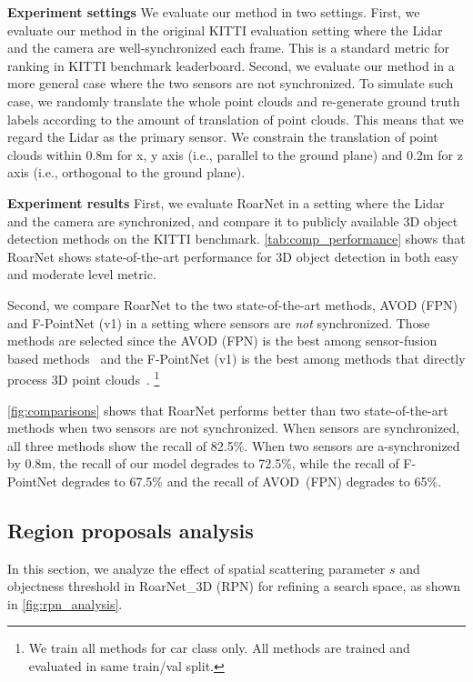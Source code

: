 \documentclass[letterpaper, 10 pt, conference]{ieeeconf}
\newcommand{\subsec}{\quad}
\begin{document}
\textbf{Experiment settings\subsec} We evaluate our method in two settings. First, we evaluate our method in the original KITTI evaluation setting where the Lidar and the camera are well-synchronized each frame. This is a standard metric for ranking in KITTI benchmark leaderboard. Second, we evaluate our method in a more general case where the two sensors are not synchronized.
To simulate such case, we randomly translate the whole point clouds and re-generate ground truth labels according to the amount of translation of point clouds. This means that we regard the Lidar as the primary sensor. We constrain the translation of point clouds within 0.8m for x, y axis (i.e., parallel to the ground plane) and 0.2m for z axis (i.e., orthogonal to the ground plane).

\textbf{Experiment results\subsec} First, we evaluate RoarNet in a setting where the Lidar and the camera are synchronized, and compare it to publicly available 3D object detection methods on the KITTI benchmark. \cref{tab:comp_performance} shows that RoarNet shows state-of-the-art performance for 3D object detection in both easy and moderate level metric.




Second, we compare RoarNet to the two state-of-the-art methods, AVOD (FPN) and F-PointNet (v1) in a setting where sensors are \textit{not} synchronized. Those methods are selected since the AVOD (FPN) is the best among sensor-fusion based methods~\cite{ku_joint_2017} and the F-PointNet (v1) is the best among methods that directly process 3D point clouds~\cite{qi_frustum_2018, zhou2017voxelnet}.
\footnote{We train all methods for car class only. All methods are trained and evaluated in same train/val split.}

\cref{fig:comparisons} shows that RoarNet performs better than two state-of-the-art methods when two sensors are not synchronized. When sensors are synchronized, all three methods show the recall of 82.5\%. When two sensors are a-synchronized by 0.8m, the recall of our model degrades to 72.5\%, while the recall of F-PointNet degrades to 67.5\% and the recall of AVOD~(FPN) degrades to 65\%.

\subsection{Region proposals analysis}
In this section, we analyze the effect of spatial scattering parameter $s$ and objectness threshold in RoarNet\_3D (RPN) for refining a search space, as shown in \cref{fig:rpn_analysis}.
\end{document}
